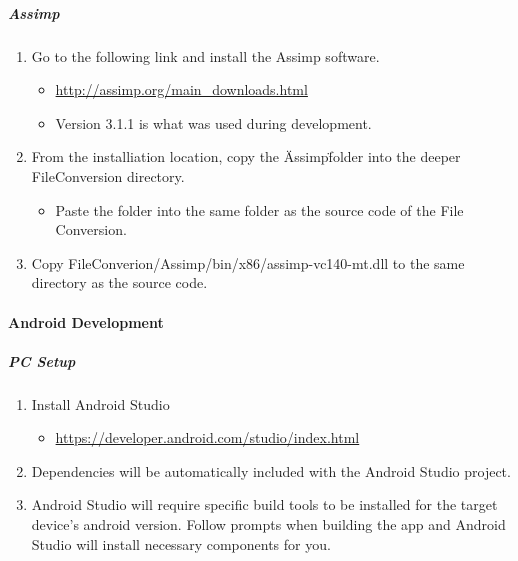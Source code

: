\subparagraph{Assimp}

\begin{enumerate}
    \item Go to the following link and install the Assimp software.
    \begin{itemize}
        \item \url{http://assimp.org/main_downloads.html}
        \item Version 3.1.1 is what was used during development.
    \end{itemize}

    \item From the installiation location, copy the \"Assimp\" folder into the deeper FileConversion directory.
    \begin{itemize}
        \item Paste the folder into the same folder as the source code of the File Conversion.
    \end{itemize}

    \item Copy FileConverion/Assimp/bin/x86/assimp-vc140-mt.dll to the same directory as the source code.
\end{enumerate}

\paragraph{Android Development}

\subparagraph{PC Setup}
\begin{enumerate}
    \item Install Android Studio
    \begin{itemize}
        \item \url{https://developer.android.com/studio/index.html}
    \end{itemize}
    \item Dependencies will be automatically included with the Android Studio project.
    \item Android Studio will require specific build tools to be installed for the target device's android version. Follow prompts when building the app and Android Studio will install necessary components for you.

\end{enumerate}

